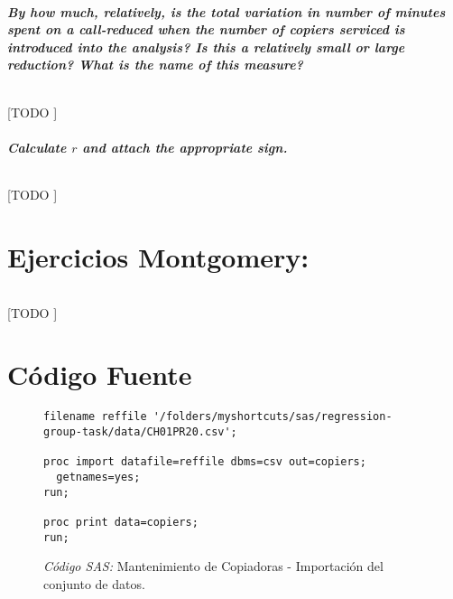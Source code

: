 \documentclass{article}
\begin{document}
      \subsubsection{By how much, relatively, is the total variation in number of minutes spent on a call-reduced when the number of copiers serviced is introduced into the analysis? Is this a relatively small or large reduction? What is the name of this measure?}

        \paragraph{}
        [TODO ]

      \subsubsection{Calculate $r$ and attach the appropriate sign.}

        \paragraph{}
        [TODO ]


  \part{Ejercicios Montgomery:}

    \paragraph{}
    [TODO ]


  \part{Código Fuente}

    \begin{figure}[!h]
      \centering
      \begin{verbatim}
filename reffile '/folders/myshortcuts/sas/regression-group-task/data/CH01PR20.csv';

proc import datafile=reffile dbms=csv out=copiers;
  getnames=yes;
run;

proc print data=copiers;
run;
      \end{verbatim}
      \caption{\emph{Código SAS:} Mantenimiento de Copiadoras - Importación del conjunto de datos.}
      \label{code:sas-copiers-1}
    \end{figure}
\end{document}
